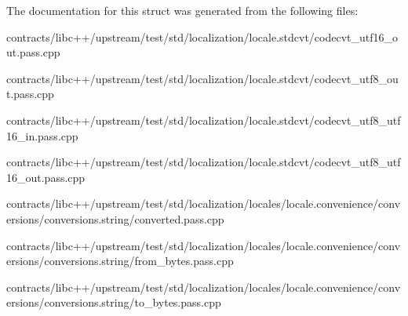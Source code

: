 The documentation for this struct was generated from the following files\+:\begin{DoxyCompactItemize}
\item 
contracts/libc++/upstream/test/std/localization/locale.\+stdcvt/codecvt\+\_\+utf16\+\_\+out.\+pass.\+cpp\item 
contracts/libc++/upstream/test/std/localization/locale.\+stdcvt/codecvt\+\_\+utf8\+\_\+out.\+pass.\+cpp\item 
contracts/libc++/upstream/test/std/localization/locale.\+stdcvt/codecvt\+\_\+utf8\+\_\+utf16\+\_\+in.\+pass.\+cpp\item 
contracts/libc++/upstream/test/std/localization/locale.\+stdcvt/codecvt\+\_\+utf8\+\_\+utf16\+\_\+out.\+pass.\+cpp\item 
contracts/libc++/upstream/test/std/localization/locales/locale.\+convenience/conversions/conversions.\+string/converted.\+pass.\+cpp\item 
contracts/libc++/upstream/test/std/localization/locales/locale.\+convenience/conversions/conversions.\+string/from\+\_\+bytes.\+pass.\+cpp\item 
contracts/libc++/upstream/test/std/localization/locales/locale.\+convenience/conversions/conversions.\+string/to\+\_\+bytes.\+pass.\+cpp\end{DoxyCompactItemize}
